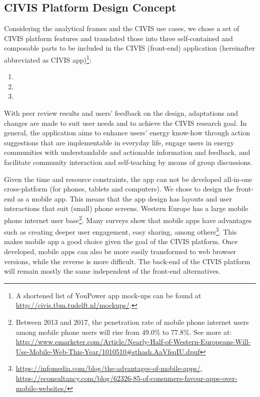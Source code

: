 \subsection{CIVIS Platform Design Concept}
\label{sect:design_concept}

Considering the analytical frames and the CIVIS use cases, we chose a set of CIVIS platform features and translated those into three self-contained and composable parts to be included in the CIVIS (front-end) application (hereinafter abbreviated as CIVIS app)\footnote{A shortened list of YouPower app mock-ups can be found at \url{http://civis.tbm.tudelft.nl/mockups/}.}: 
\begin{enumerate}
\item {}
\item {}
\item {}
\end{enumerate}



With peer review results and users' feedback on the design, adaptations and changes are made to suit user needs and to achieve the CIVIS research goal. 
In general, the application aims to enhance users' energy know-how through action suggestions that are implementable in everyday life, engage users in energy communities with understandable and actionable information and feedback, and facilitate community interaction and self-teaching by means of group discussions.
%

Given the time and resource constraints, the app can not be developed all-in-one cross-platform (for phones, tablets and computers). We chose to design the front-end as a mobile app. This means that the app design has layouts and user interactions that suit (small) phone screens. %
Western Europe has a large mobile phone internet user base\footnote{
Between 2013 and 2017, the penetration rate of mobile phone internet users among mobile phone users will rise from 49.0\% to 77.8\%. See more at:\url{ http://www.emarketer.com/Article/Nearly-Half-of-Western-Europeans-Will-Use-Mobile-Web-This-Year/1010510\#sthash.AaVfsqIU.dpuf}}. Many surveys show that mobile apps have advantages such as creating deeper user engagement, easy sharing, among others\footnote{\url{https://infomedia.com/blog/the-advantages-of-mobile-apps/}, \url{https://econsultancy.com/blog/62326-85-of-consumers-favour-apps-over-mobile-websites/}}. This makes mobile app a good choice given the goal of the CIVIS platform. Once developed, mobile apps can also be more easily transformed to web browser versions, while the reverse is more difficult. The back-end of the CIVIS platform will remain mostly the same independent of the front-end alternatives. 



